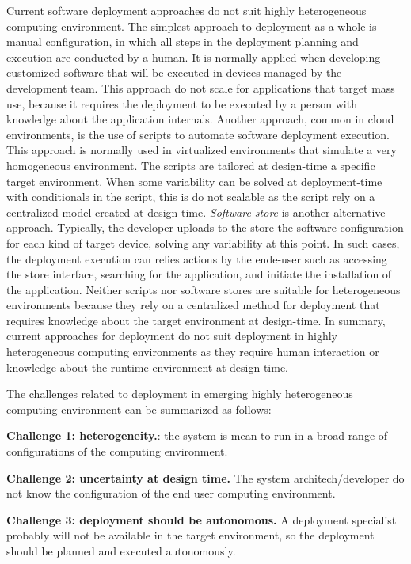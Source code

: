 Current software deployment approaches do not suit highly heterogeneous computing environment.
The simplest approach to deployment as a whole is manual configuration, in which all steps in the deployment planning and execution are conducted by a human. It is normally applied when developing customized software that will be executed in devices managed by the development team. This approach do not scale for applications that target mass use, because it requires the deployment to be executed by a person with knowledge about the application internals.
Another approach, common in cloud environments, is the use of scripts to automate software deployment execution. This approach is normally used in virtualized environments that simulate a very homogeneous environment. The scripts are tailored at design-time a specific target environment. When some variability can be solved at deployment-time with conditionals in the script, this is do not scalable as the script rely on a centralized model created at design-time.
\emph{Software store} is another alternative approach. Typically, the developer uploads to the store the software configuration for each kind of target device, solving any variability at this point.
In such cases, the deployment execution can relies actions by the ende-user such as accessing the store interface, searching for the application, and initiate the installation of the application.
Neither scripts nor software stores are suitable for heterogeneous environments because they rely on a centralized method for deployment that requires knowledge about the target environment at design-time. In summary, current approaches for deployment do not suit deployment in highly heterogeneous computing environments as they require human interaction or knowledge about the runtime environment at design-time.

The challenges related to deployment in emerging highly heterogeneous computing environment can be summarized as follows:

\textbf{ Challenge 1: heterogeneity.}: the system is mean to run in a broad range of configurations of the computing environment.

\textbf{ Challenge 2: uncertainty at design time.} The system architech/developer do not know the configuration of the end user computing environment.

\textbf{ Challenge 3: deployment should be autonomous.} A deployment specialist probably will not be available in the target environment, so the deployment should be planned and executed autonomously.


